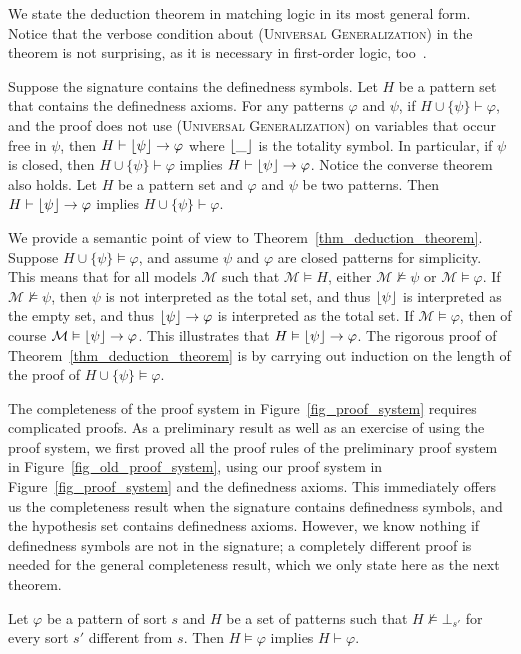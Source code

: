 \documentclass[acmsmall,review,anonymous]{acmart}
\newcommand{\imp}{\to}
\newcommand{\MM}{\mathcal{M}}
\DeclarePairedDelimiter{\floor}{\lfloor}{\rfloor}
\newcommand{\prule}[1]{\textsc{(#1)}}
\newcommand{\universalgeneralization}{\prule{Universal Generalization}\xspace}
\begin{document}
We state the deduction theorem in matching logic in its most
general form.
Notice that
the verbose condition about \universalgeneralization
in the theorem is not surprising,
as it is necessary in first-order logic, too~\cite{hamilton1988logic}.
\begin{theorem}
\label{thm_deduction_theorem}
Suppose the signature contains the definedness symbols.
Let $H$ be a pattern set that contains
the definedness axioms.
For any patterns $\varphi$ and $\psi$,
if $H \cup \{ \psi \} \vdash \varphi$,
and the proof does not use
\universalgeneralization on variables that occur free in $\psi$,
then $H \vdash \floor{\psi} \imp \varphi$
where $\floor{\_}$ is the totality symbol.
In particular, if $\psi$ is closed,
then $H \cup \{ \psi \} \vdash \varphi$
implies $H \vdash \floor{\psi} \imp \varphi$.
Notice the converse theorem also holds.
Let $H$ be a pattern set and $\varphi$ and $\psi$ be two patterns.
Then 
$H \vdash \floor{\psi} \imp \varphi$ implies
$H \cup \{ \psi \} \vdash \varphi$.
\end{theorem}

We provide a semantic point of view to Theorem~\ref{thm_deduction_theorem}.
Suppose $H \cup \{ \psi \} \vDash \varphi$,
and assume $\psi$ and $\varphi$ are closed patterns for simplicity.
This means that for all models $\MM$ such that $\MM \vDash H$,
either $\MM \not\vDash \psi$ or $\MM \vDash \varphi$.
If $\MM \not\vDash \psi$,
then $\psi$ is not interpreted as the total set,
and thus $\floor{\psi}$ is interpreted as the empty set,
and thus $\floor{\psi} \imp \varphi$ is interpreted as the total set.
If $\MM \vDash \varphi$,
then of course $\MM \vDash \floor{\psi} \imp \varphi$.
This illustrates that $H \vDash \floor{\psi} \imp \varphi$.
The rigorous proof of Theorem~\ref{thm_deduction_theorem}
is by carrying out induction on the length of the proof of
$H \cup \{ \psi \} \vDash \varphi$.




The completeness of the proof system in Figure~\ref{fig_proof_system}
requires complicated proofs.
As a preliminary result as well as an exercise of using
the proof system, 
we first proved all the proof rules of the preliminary proof system
in Figure~\ref{fig_old_proof_system},
using our proof system in Figure~\ref{fig_proof_system}
and the definedness axioms.
This immediately offers us the completeness result
when the signature contains definedness symbols, and 
the hypothesis set contains definedness axioms.
However, we know nothing if definedness symbols are not in the signature;
a completely different proof is needed for the general completeness result,
which we only state here as the next theorem.
\begin{theorem}
\label{thm_completeness}
Let $\varphi$ be a pattern of sort $s$ and $H$ 
be a set of patterns
such that $H \not\vDash \bot_{s'}$ for every sort $s'$ different from $s$.  
Then $H \vDash \varphi$ implies $H \vdash \varphi$.
\end{theorem}
\end{document}
